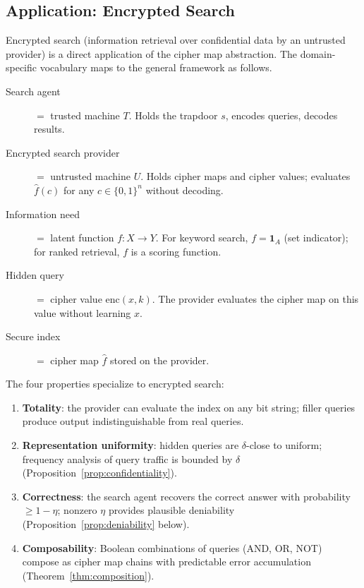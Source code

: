 \documentclass[11pt]{article}
\theoremstyle{definition}
\theoremstyle{plain}
\theoremstyle{remark}
\newcommand{\fhat}{\hat{f}}
\newcommand{\enc}{\mathrm{enc}}
\begin{document}
\subsection{Application: Encrypted Search}
\label{subsec:encrypted-search}

Encrypted search (information retrieval over confidential data by an
untrusted provider) is a direct application of the cipher map
abstraction.  The domain-specific vocabulary maps to the general
framework as follows.

\begin{description}
\item[Search agent] $=$ trusted machine $T$.  Holds the trapdoor $s$,
    encodes queries, decodes results.
\item[Encrypted search provider] $=$ untrusted machine $U$.  Holds
    cipher maps and cipher values; evaluates $\fhat(c)$ for any
    $c \in \{0,1\}^n$ without decoding.
\item[Information need] $=$ latent function $f : X \to Y$.  For keyword
    search, $f = \mathbf{1}_A$ (set indicator); for ranked retrieval,
    $f$ is a scoring function.
\item[Hidden query] $=$ cipher value $\enc(x, k)$.  The provider
    evaluates the cipher map on this value without learning $x$.
\item[Secure index] $=$ cipher map $\fhat$ stored on the provider.
\end{description}

\noindent
The four properties specialize to encrypted search:
\begin{enumerate}
\item \textbf{Totality}: the provider can evaluate the index on any bit
    string; filler queries produce output indistinguishable from real
    queries.
\item \textbf{Representation uniformity}: hidden queries are
    $\delta$-close to uniform; frequency analysis of query traffic is
    bounded by $\delta$ (Proposition~\ref{prop:confidentiality}).
\item \textbf{Correctness}: the search agent recovers the correct
    answer with probability $\geq 1 - \eta$; nonzero $\eta$ provides
    plausible deniability (Proposition~\ref{prop:deniability} below).
\item \textbf{Composability}: Boolean combinations of queries (AND,
    OR, NOT) compose as cipher map chains with predictable error
    accumulation (Theorem~\ref{thm:composition}).
\end{enumerate}
\end{document}
